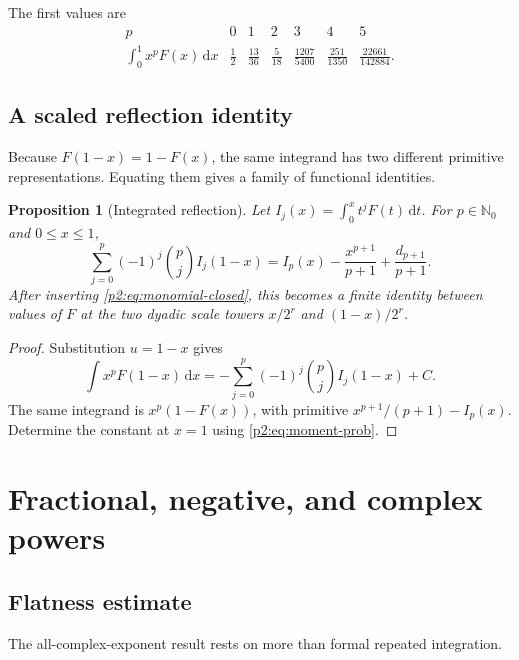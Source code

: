 \documentclass[11pt,oneside]{article}
\newtheorem{proposition}[theorem]{Proposition}
\theoremstyle{definition}
\theoremstyle{remark}
\newcommand{\N}{\mathbb N}
\newcommand{\dd}{\,\mathrm d}
\newcommand{\1}{\mathbf 1}
\begin{document}
The first values are
\begin{equation}
\begin{array}{c|cccccc}
 p&0&1&2&3&4&5\\ \hline
 \displaystyle\int_0^1x^pF(x)\dd x
 &\frac12&\frac{13}{36}&\frac5{18}&\frac{1207}{5400}
 &\frac{251}{1350}&\frac{22661}{142884}.
\end{array}                                                \label{p2:eq:first-moments-table}
\end{equation}

\subsection{A scaled reflection identity}
Because $F(1-x)=1-F(x)$, the same integrand has two different primitive
representations.  Equating them gives a family of functional identities.

\begin{proposition}[Integrated reflection]
\label{p2:prop:integrated-reflection}
Let $I_j(x)=\int_0^xt^jF(t)\dd t$.  For $p\in\N_0$ and $0\le x\le1$,
\begin{equation}
 \boxed{
 \sum_{j=0}^{p}(-1)^j\binom pj I_j(1-x)
 =I_p(x)-\frac{x^{p+1}}{p+1}+\frac{d_{p+1}}{p+1}.}         \label{p2:eq:integrated-reflection}
\end{equation}
After inserting \eqref{p2:eq:monomial-closed}, this becomes a finite identity
between values of $F$ at the two dyadic scale towers
$x/2^r$ and $(1-x)/2^r$.
\end{proposition}

\begin{proof}
Substitution $u=1-x$ gives
\[
 \int x^pF(1-x)\dd x
 =-\sum_{j=0}^{p}(-1)^j\binom pjI_j(1-x)+C.
\]
The same integrand is $x^p(1-F(x))$, with primitive
$x^{p+1}/(p+1)-I_p(x)$.  Determine the constant at $x=1$ using
\eqref{p2:eq:moment-prob}.
\end{proof}

\section{Fractional, negative, and complex powers}
\label{p2:sec:complex-powers}

\subsection{Flatness estimate}
The all-complex-exponent result rests on more than formal repeated integration.
\end{document}
